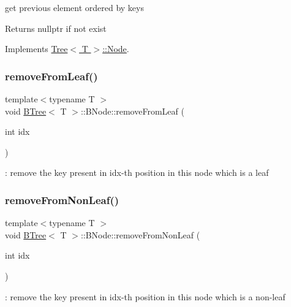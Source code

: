 get previous element ordered by keys 

\begin{DoxyReturn}{Returns}
nullptr if not exist 
\end{DoxyReturn}


Implements \hyperlink{classTree_1_1Node_a3f912d90adc2c50de5ce7f96e6695c96}{Tree$<$ T $>$\+::\+Node}.

\mbox{\label{classBTree_1_1BNode_a1153066a0735afbd355c762795b68222}} 
\subsubsection{\texorpdfstring{remove\+From\+Leaf()}{removeFromLeaf()}}
{\footnotesize\ttfamily template$<$typename T $>$ \\
void \hyperlink{classBTree}{B\+Tree}$<$ T $>$\+::B\+Node\+::remove\+From\+Leaf (\begin{DoxyParamCaption}\item[{int}]{idx }\end{DoxyParamCaption})}

\+: remove the key present in idx-\/th position in this node which is a leaf \mbox{\label{classBTree_1_1BNode_acea1502de0852161a72a4c11e122e58e}} 
\subsubsection{\texorpdfstring{remove\+From\+Non\+Leaf()}{removeFromNonLeaf()}}
{\footnotesize\ttfamily template$<$typename T $>$ \\
void \hyperlink{classBTree}{B\+Tree}$<$ T $>$\+::B\+Node\+::remove\+From\+Non\+Leaf (\begin{DoxyParamCaption}\item[{int}]{idx }\end{DoxyParamCaption})}

\+: remove the key present in idx-\/th position in this node which is a non-\/leaf \mbox{\label{classBTree_1_1BNode_a0b356b6ac1ec3d8e0cbfb68d9e5f7582}} 
